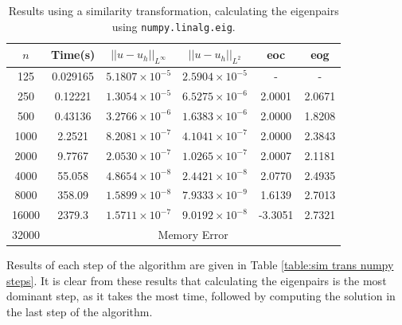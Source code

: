 \documentclass[11pt]{article}
\numberwithin{equation}{section}
\begin{document}
\begin{table}[H]
\centering
\begin{tabular}{|c|c|c|c|c|c|}
\hline
$n$ & Time(s) & $|| u - u_h ||_{L^{\infty}}$ &$|| u - u_h ||_{L^{2}}$ & eoc & eog \\
\hline
125 & 0.029165 & $5.1807 \times 10^{-5}$ & $2.5904 \times 10^{-5}$ & -  & - \\
250 & 0.12221 & $1.3054 \times 10^{-5}$ & $6.5275 \times 10^{-6}$ & 2.0001 &   2.0671 \\
500 & 0.43136 & $3.2766 \times 10^{-6}$ & $1.6383 \times 10^{-6}$ & 2.0000 & 1.8208   \\
1000 & 2.2521 & $8.2081 \times 10^{-7}$ & $4.1041 \times 10^{-7}$ & 2.0000 & 2.3843   \\
2000 & 9.7767 & $2.0530 \times 10^{-7}$ & $1.0265 \times 10^{-7}$ & 2.0007 & 2.1181   \\
4000 & 55.058 & $4.8654 \times 10^{-8}$ & $2.4421 \times 10^{-8}$ & 2.0770 &   2.4935 \\
8000 & 358.09  & $1.5899 \times 10^{-8}$ & $7.9333 \times 10^{-9}$ & 1.6139 & 2.7013   \\
16000 & 2379.3 & $1.5711 \times 10^{-7}$ & $9.0192 \times 10^{-8}$ & -3.3051 & 2.7321 \\
\cline{2-6}
32000 & \multicolumn{5}{c|}{Memory Error} \\
\hline
\end{tabular}
\captionsetup{justification=centering}
\caption{Results using a similarity transformation, calculating the eigenpairs using \texttt{numpy.linalg.eig}.}
\label{table:sim trans numpy}
\end{table}

Results of each step of the algorithm are given in Table \ref{table:sim trans numpy steps}. It is clear from these results that calculating the eigenpairs is the most dominant step, as it takes the most time, followed by computing the solution in the last step of the algorithm.
\end{document}
